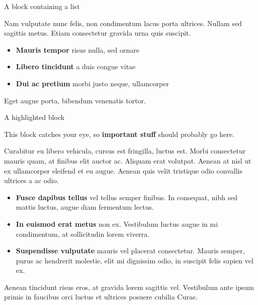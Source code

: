 \documentclass[final]{beamer}
\newlength{\colwidth}
\begin{document}
\begin{frame}[t]
\begin{columns}[t]
\begin{column}{\colwidth}

  \begin{block}{A block containing a list}

    Nam vulputate nunc felis, non condimentum lacus porta ultrices. Nullam sed
    sagittis metus. Etiam consectetur gravida urna quis suscipit.

    \begin{itemize}
      \item \textbf{Mauris tempor} risus nulla, sed ornare
      \item \textbf{Libero tincidunt} a duis congue vitae
      \item \textbf{Dui ac pretium} morbi justo neque, ullamcorper
    \end{itemize}

    Eget augue porta, bibendum venenatis tortor.

  \end{block}

  \begin{alertblock}{A highlighted block}

    This block catches your eye, so \textbf{important stuff} should probably go
    here.

    Curabitur eu libero vehicula, cursus est fringilla, luctus est. Morbi
    consectetur mauris quam, at finibus elit auctor ac. Aliquam erat volutpat.
    Aenean at nisl ut ex ullamcorper eleifend et eu augue. Aenean quis velit
    tristique odio convallis ultrices a ac odio.

    \begin{itemize}
      \item \textbf{Fusce dapibus tellus} vel tellus semper finibus. In
        consequat, nibh sed mattis luctus, augue diam fermentum lectus.
      \item \textbf{In euismod erat metus} non ex. Vestibulum luctus augue in
        mi condimentum, at sollicitudin lorem viverra.
      \item \textbf{Suspendisse vulputate} mauris vel placerat consectetur.
        Mauris semper, purus ac hendrerit molestie, elit mi dignissim odio, in
        suscipit felis sapien vel ex.
    \end{itemize}

    Aenean tincidunt risus eros, at gravida lorem sagittis vel. Vestibulum ante
    ipsum primis in faucibus orci luctus et ultrices posuere cubilia Curae.

  \end{alertblock}


\end{column}
\end{columns}
\end{frame}
\end{document}
